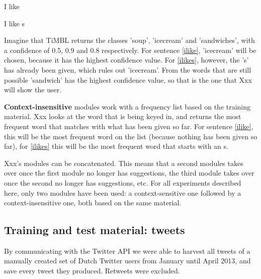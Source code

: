 \documentclass[11pt]{article}
\begin{document}
\begin{examples}
\item I like \label{ilike}
\item I like s \label{ilikes}
\end{examples}

Imagine that TiMBL returns the classes 'soup', 'icecream' and 'sandwiches', with a confidence of 0.5, 0.9 and 0.8 respectively. For sentence \ref{ilike}, 'icecream' will be chosen, because it has the highest confidence value. For \ref{ilikes}, however, the 's' has already been given, which rules out 'icecream'. From the words that are still possible 'sandwich' has the highest confidence value, so that is the one that Xxx will show the user.

\textbf{Context-insensitive} modules work with a frequency list based on the training material. Xxx looks at the word that is being keyed in, and returns the most frequent word that matches with what has been given so far. For sentence \ref{ilike}, this will be the most frequent word on the list (because nothing has been given so far), for \ref{ilikes} this will be the most frequent word that starts with an s.

Xxx's modules can be concatenated. This means that a second modules takes over once the first module no longer has suggestions, the third module takes over once the second no longer has suggestions, etc. For all experiments described here, only two modules have been used: a context-sensitive one followed by a context-insensitive one, both based on the same material.

\subsection{Training and test material: tweets}


By communicating with the Twitter API we were able to harvest all tweets of a manually created set of Dutch Twitter users from January until April 2013, and save every tweet they produced. Retweets were excluded.
\end{document}
